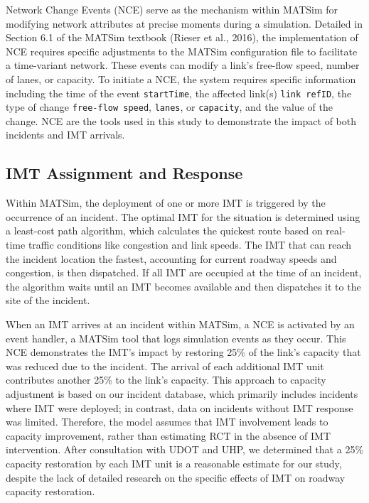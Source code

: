 \documentclass[fancy, oneside, mastersfancy, ms]{byuthesis}
\begin{document}
Network Change Events (NCE) serve as the mechanism within MATSim for
modifying network attributes at precise moments during a simulation.
Detailed in Section 6.1 of the MATSim textbook (Rieser et al., 2016),
the implementation of NCE requires specific adjustments to the MATSim
configuration file to facilitate a time-variant network. These events
can modify a link's free-flow speed, number of lanes, or capacity. To
initiate a NCE, the system requires specific information including the
time of the event \texttt{startTime}, the affected link(s)
\texttt{link\ refID}, the type of change \texttt{free-flow\ speed},
\texttt{lanes}, or \texttt{capacity}, and the value of the change. NCE
are the tools used in this study to demonstrate the impact of both
incidents and IMT arrivals.

\hypertarget{sec-imt_response}{%
\subsection{IMT Assignment and Response}\label{sec-imt_response}}

Within MATSim, the deployment of one or more IMT is triggered by the
occurrence of an incident. The optimal IMT for the situation is
determined using a least-cost path algorithm, which calculates the
quickest route based on real-time traffic conditions like congestion and
link speeds. The IMT that can reach the incident location the fastest,
accounting for current roadway speeds and congestion, is then
dispatched. If all IMT are occupied at the time of an incident, the
algorithm waits until an IMT becomes available and then dispatches it to
the site of the incident.

When an IMT arrives at an incident within MATSim, a NCE is activated by
an event handler, a MATSim tool that logs simulation events as they
occur. This NCE demonstrates the IMT's impact by restoring 25\% of the
link's capacity that was reduced due to the incident. The arrival of
each additional IMT unit contributes another 25\% to the link's
capacity. This approach to capacity adjustment is based on our incident
database, which primarily includes incidents where IMT were deployed; in
contrast, data on incidents without IMT response was limited. Therefore,
the model assumes that IMT involvement leads to capacity improvement,
rather than estimating RCT in the absence of IMT intervention. After
consultation with UDOT and UHP, we determined that a 25\% capacity
restoration by each IMT unit is a reasonable estimate for our study,
despite the lack of detailed research on the specific effects of IMT on
roadway capacity restoration.
\end{document}
